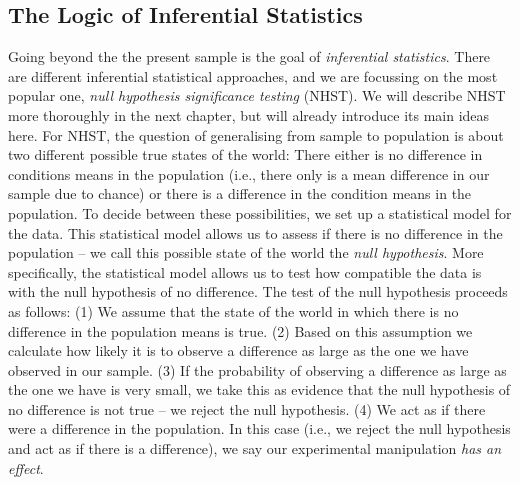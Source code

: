 \documentclass[
]{book}
\begin{document}
\hypertarget{the-logic-of-inferential-statistics}{%
\subsection{The Logic of Inferential Statistics}\label{the-logic-of-inferential-statistics}}

Going beyond the the present sample is the goal of \emph{inferential statistics}. There are different inferential statistical approaches, and we are focussing on the most popular one, \emph{null hypothesis significance testing} (NHST). We will describe NHST more thoroughly in the next chapter, but will already introduce its main ideas here. For NHST, the question of generalising from sample to population is about two different possible true states of the world: There either is no difference in conditions means in the population (i.e., there only is a mean difference in our sample due to chance) or there is a difference in the condition means in the population. To decide between these possibilities, we set up a statistical model for the data. This statistical model allows us to assess if there is no difference in the population -- we call this possible state of the world the \emph{null hypothesis}. More specifically, the statistical model allows us to test how compatible the data is with the null hypothesis of no difference. The test of the null hypothesis proceeds as follows: (1) We assume that the state of the world in which there is no difference in the population means is true. (2) Based on this assumption we calculate how likely it is to observe a difference as large as the one we have observed in our sample. (3) If the probability of observing a difference as large as the one we have is very small, we take this as evidence that the null hypothesis of no difference is not true -- we reject the null hypothesis. (4) We act as if there were a difference in the population. In this case (i.e., we reject the null hypothesis and act as if there is a difference), we say our experimental manipulation \emph{has an effect}.
\end{document}
